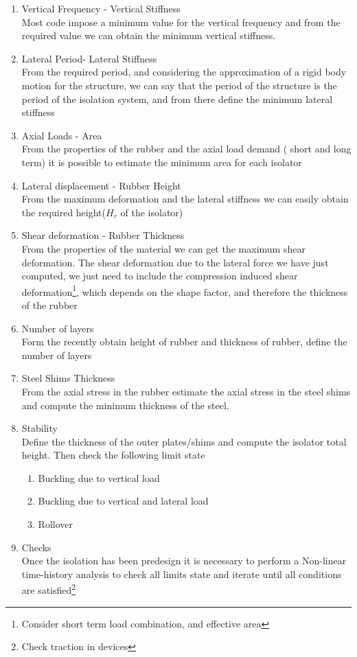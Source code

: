 \documentclass{article}
\begin{document}
\begin{enumerate}
\item{Vertical Frequency - Vertical Stiffness}\\
Most code impose a minimum value for the vertical frequency  and from the required value we can obtain the minimum vertical stiffness.
\item{Lateral Period- Lateral Stiffness}\\
From the required period, and considering the approximation of a rigid body motion for the structure, we can say that the period of the structure is the period of the isolation system, and from there define the minimum lateral stiffness
\item{Axial Loads - Area}\\
From the properties of the rubber and the axial load demand ( short and long term) it is possible to estimate the minimum area for each isolator
\item{Lateral displacement - Rubber Height}\\
From the maximum deformation and the lateral stiffness we can easily obtain the required  height($H_r$ of the isolator)
\item{Shear deformation - Rubber Thickness}\\
From the properties of the material we can get the maximum shear deformation. The shear deformation due to the lateral force we have just computed, we just need to include the compression induced shear deformation\footnote{Consider short term load combination, and effective area}, which depends on the shape factor, and therefore the thickness of the rubber
\item{Number of layers}\\
Form the recently obtain height of rubber and thickness of rubber, define the number of layers
\item {Steel Shims Thickness}\\
From the axial stress in the rubber estimate the axial stress in the steel shims and compute the minimum thickness of the steel.
\item{Stability}\\
Define the thickness of the outer plates/shims and compute the isolator total height. Then check the following limit state
\begin{enumerate}
    \item Buckling due to vertical load
    \item Buckling due to vertical and lateral load
    \item Rollover
\end{enumerate}
\item {Checks}\\
Once the isolation has been predesign it is necessary to perform a Non-linear time-history analysis to check all limits state and iterate until all conditions are satisfied\footnote{ Check traction in devices}
\end{enumerate}
\end{document}

